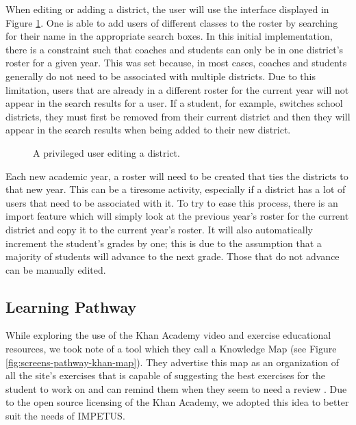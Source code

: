 When editing or adding a district, the user will use the interface displayed in Figure \ref{fig:screens-district-edit}. One is able to add users of different classes to the roster by searching for their name in the appropriate search boxes. In this initial implementation, there is a constraint such that coaches and students can only be in one district's roster for a given year. This was set because, in most cases, coaches and students generally do not need to be associated with multiple districts. Due to this limitation, users that are already in a different roster for the current year will not appear in the search results for a user. If a student, for example, switches school districts, they must first be removed from their current district and then they will appear in the search results when being added to their new district.

\begin{figure}[h!]
	\centering
	\caption{A privileged user editing a district.}
	\label{fig:screens-district-edit}
\end{figure}

Each new academic year, a roster will need to be created that ties the districts to that new year. This can be a tiresome activity, especially if a district has a lot of users that need to be associated with it. To try to ease this process, there is an import feature which will simply look at the previous year's roster for the current district and copy it to the current year's roster. It will also automatically increment the student's grades by one; this is due to the assumption that a majority of students will advance to the next grade. Those that do not advance can be manually edited.

\subsection{Learning Pathway}
\label{subsec:design-pathway}
While exploring the use of the Khan Academy video and exercise educational resources, we took note of a tool which they call a Knowledge Map (see Figure \ref{fig:screens-pathway-khan-map}). They advertise this map as an organization of all the site's exercises that is capable of suggesting the best exercises for the student to work on and can remind them when they seem to need a review \cite{khan-website-about}. Due to the open source licensing of the Khan Academy, we adopted this idea to better suit the needs of IMPETUS.


